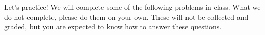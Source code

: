 Let's practice!  We will complete some of the following problems
in class.  What we do not
complete, please do them on your own.  These will not be collected and graded,
but you are expected to know how to answer these questions.
